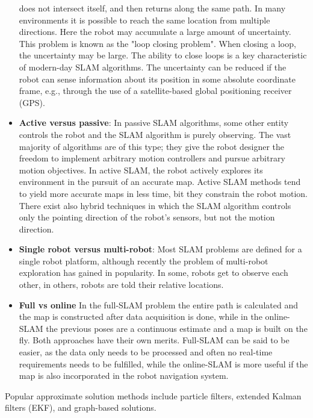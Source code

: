 \begin{itemize}
        does not intersect itself, and then returns along the same path.
        In many environments it is possible to reach the same location
        from multiple directions.
        Here the robot may accumulate a large amount of uncertainty.
        This problem is known as the "loop closing problem".
        When closing a loop, the uncertainty may be large.
        The ability to close loops is a key characteristic of modern-day
        SLAM algorithms.
        The uncertainty can be reduced if the robot can sense information
        about its position in some absolute coordinate frame, e.g.,
        through the use of a satellite-based global positioning receiver (GPS).
    \item \textbf{Active versus passive}: In passive SLAM algorithms,
        some other entity controls the robot and the SLAM algorithm is
        purely observing.
        The vast majority of algorithms are of this type;
        they give the robot designer the freedom to implement arbitrary
        motion controllers and pursue arbitrary motion objectives.
        In active SLAM, the robot actively explores its environment in
        the pursuit of an accurate map.
        Active SLAM methods tend to yield more accurate maps in less time,
        bit they constrain the robot motion.
        There exist also hybrid techniques in which the SLAM algorithm
        controls only the pointing direction of the robot's sensors,
        but not the motion direction.
    \item \textbf{Single robot versus multi-robot}: Most SLAM problems are
        defined for a single robot platform, although recently the problem
        of multi-robot exploration has gained in popularity.
        In some, robots get to observe each other, in others,
        robots are told their relative locations.
    \item \textbf{Full vs online} In the full-SLAM problem the entire path
        is calculated and the map is constructed after data acquisition
        is done, while in the online-SLAM the previous poses are a
        continuous estimate and a map is built on the fly.
        Both approaches have their own merits.
        Full-SLAM can be said to be easier, as the data only needs to be
        processed and often no real-time requirements needs to be fulfilled,
        while the online-SLAM is more useful if the map is also
        incorporated in the robot navigation system.
\end{itemize}

Popular approximate solution methods include particle filters, extended
Kalman filters (EKF), and graph-based solutions.

